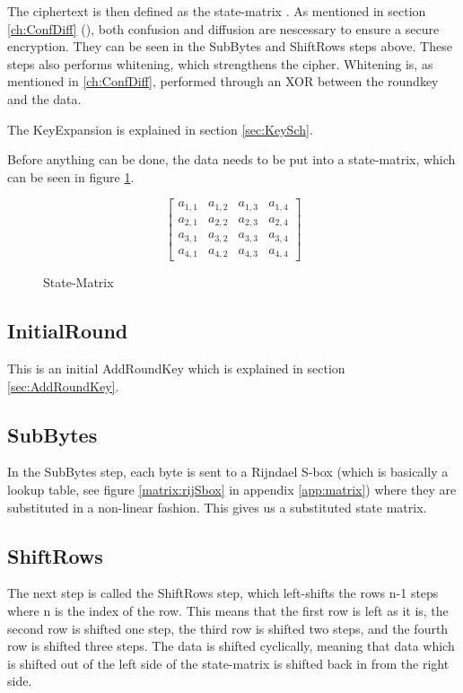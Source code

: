 The ciphertext is then defined as the state-matrix 
\citep[p. 103]{Stinson:2006}. As mentioned in section 
\ref{ch:ConfDiff} (), both confusion and 
diffusion are nescessary to ensure a secure encryption. They can be 
seen in the SubBytes and ShiftRows steps above. These steps also 
performs whitening, which strengthens the cipher. Whitening is, as 
mentioned in \ref{ch:ConfDiff}, performed through an XOR between the 
roundkey and the data.

The KeyExpansion is explained in section \ref{sec:KeySch}.

Before anything can be done, the data needs to be put into a 
state-matrix, which can be seen in figure \ref{matrix2:state}.

\begin{figure}[h!]
  \begin{equation}
    \begin{bmatrix}
      a_{1, 1} & a_{1, 2} & a_{1, 3} & a_{1, 4} \\
      a_{2, 1} & a_{2, 2} & a_{2, 3} & a_{2, 4} \\
      a_{3, 1} & a_{3, 2} & a_{3, 3} & a_{3, 4} \\
      a_{4, 1} & a_{4, 2} & a_{4, 3} & a_{4, 4}
    \end{bmatrix}
  \end{equation}
  \caption{State-Matrix}
  \label{matrix2:state}
\end{figure}

\subsection{InitialRound}
This is an initial AddRoundKey which is explained in section 
\ref{sec:AddRoundKey}.

\subsection{SubBytes}
In the SubBytes step, each byte is sent to a Rijndael S-box (which is 
basically a lookup table, see figure \ref{matrix:rijSbox} in appendix 
\ref{app:matrix}) where they are substituted in a non-linear fashion. 
This gives us a substituted state matrix.

\subsection{ShiftRows}
The next step is called the ShiftRows step, which left-shifts the rows 
n-1 steps where n is the index of the row. This means that the first 
row is left as it is, the second row is shifted one step, the third 
row is shifted two steps, and the fourth row is shifted three steps.
The data is shifted cyclically, meaning that data which is shifted 
out of the left side of the state-matrix is shifted back in from the 
right side.


